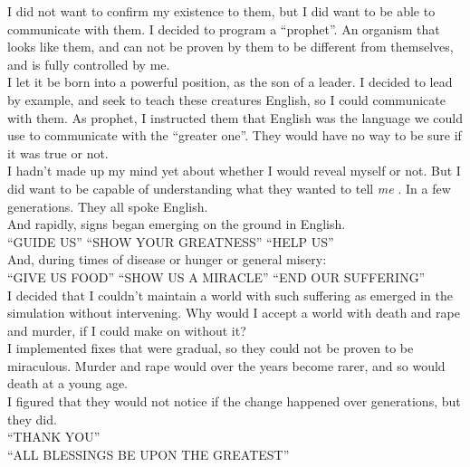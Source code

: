 \documentclass[a5paper]{scrartcl}
\begin{document}
I did not want to confirm my existence to them, but I did want to be able to communicate with them. I decided to program a \enquote{prophet}. An organism that looks like them, and can not be proven by them to be different from themselves, and is fully controlled by me.\\


I let it be born into a powerful position, as the son of a leader. I decided to lead by example, and seek to teach these creatures English, so I could communicate with them. As prophet, I instructed them that English was the language we could use to communicate with the \enquote{greater one}. They would have no way to be sure if it was true or not.\\


I hadn't made up my mind yet about whether I would reveal myself or not. But I did want to be capable of understanding what they wanted to tell \textit{me}
. In a few generations. They all spoke English.\\


And rapidly, signs began emerging on the ground in English.\\


\enquote{GUIDE US} \enquote{SHOW YOUR GREATNESS} \enquote{HELP US}\\


And, during times of disease or hunger or general misery:\\


\enquote{GIVE US FOOD} \enquote{SHOW US A MIRACLE} \enquote{END OUR SUFFERING}\\


I decided that I couldn't maintain a world with such suffering as emerged in the simulation without intervening. Why would I accept a world with death and rape and murder, if I could make on without it? \\


I implemented fixes that were gradual, so they could not be proven to be miraculous. Murder and rape would over the years become rarer, and so would death at a young age.\\


I figured that they would not notice if the change happened over generations, but they did. \\


\enquote{THANK YOU}\\


\enquote{ALL BLESSINGS BE UPON THE GREATEST}\\
\end{document}
